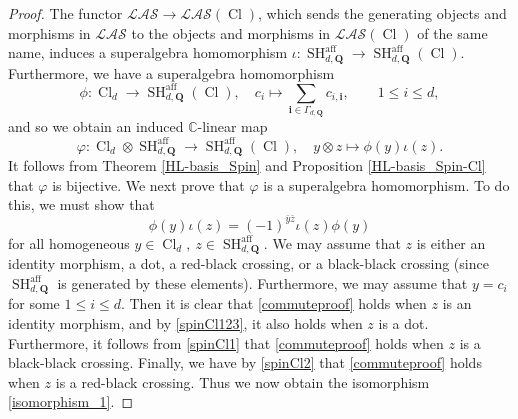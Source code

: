 \documentclass[11pt]{amsart}
\theoremstyle{definition}
\numberwithin{equation}{section}
\begin{document}
\begin{proof}
The functor $ \mathcal{LAS} \rightarrow \mathcal{LAS}(\operatorname{Cl}) $, which sends the generating objects and morphisms in $ \mathcal{LAS} $ to the objects and morphisms in $ \mathcal{LAS}(\operatorname{Cl}) $ of the same name, induces a superalgebra homomorphism $ \iota \colon \operatorname{SH}^{\operatorname{aff}}_{d,\mathbf{Q}} \rightarrow \operatorname{SH}^{\operatorname{aff}}_{d,\mathbf{Q}}(\operatorname{Cl}) $. Furthermore, we have a superalgebra homomorphism 
\begin{equation*}
\phi \colon \operatorname{Cl}_{d} \rightarrow \operatorname{SH}^{\operatorname{aff}}_{d,\mathbf{Q}}(\operatorname{Cl}), \quad c_{i} \mapsto \sum_{\mathbf{i} \in \Gamma_{d,\mathbf{Q}}} c_{i,\mathbf{i}}, \qquad 1 \leq i \leq d,
\end{equation*}
and so we obtain an induced $ \mathbb{C} $-linear map 
\begin{equation*}
\varphi \colon \operatorname{Cl}_{d} \otimes \operatorname{SH}^{\operatorname{aff}}_{d,\mathbf{Q}} \rightarrow \operatorname{SH}^{\operatorname{aff}}_{d,\mathbf{Q}}(\operatorname{Cl}), \quad y \otimes z \mapsto \phi(y)\iota(z).
\end{equation*}
It follows from Theorem \ref{HL-basis_Spin} and Proposition \ref{HL-basis_Spin-Cl} that $ \varphi $ is bijective. We next prove that $ \varphi $ is a superalgebra homomorphism. To do this, we must show that
\begin{equation} \label{commuteproof}
\phi(y)\iota(z) = (-1)^{\bar{y}\bar{z}}\iota(z)\phi(y)
\end{equation}
for all homogeneous $ y \in \operatorname{Cl}_{d}, \ z \in \operatorname{SH}^{\operatorname{aff}}_{d,\mathbf{Q}} $. We may assume that $ z $ is either an identity morphism, a dot, a red-black crossing, or a black-black crossing (since $ \operatorname{SH}^{\operatorname{aff}}_{d,\mathbf{Q}} $ is generated by these elements). Furthermore, we may assume that $ y = c_{i} $ for some $ 1 \leq i \leq d $. Then it is clear that \cref{commuteproof} holds when $ z $ is an identity morphism, and by \cref{spinCl123}, it also holds when \(z\) is a dot. Furthermore, it follows from \cref{spinCl1} that \cref{commuteproof} holds when \(z\) is a black-black crossing. Finally, we have by \cref{spinCl2} that \cref{commuteproof} holds when \(z\) is a red-black crossing. Thus we now obtain the isomorphism \cref{isomorphism_1}.


\end{proof}
\end{document}
